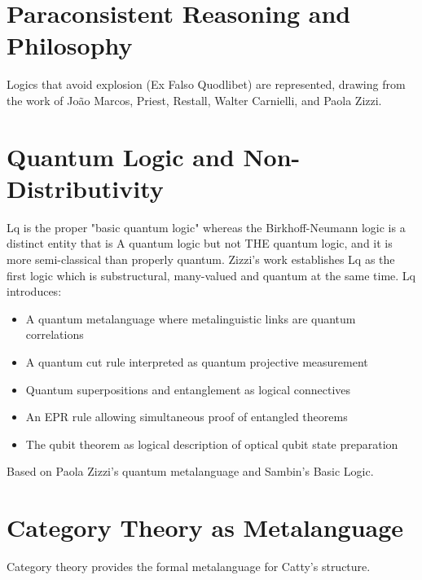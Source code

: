 \section*{Paraconsistent Reasoning and Philosophy}
Logics that avoid explosion (Ex Falso Quodlibet) are represented, drawing from the work of João Marcos, Priest, Restall, Walter Carnielli, and Paola Zizzi.

\section*{Quantum Logic and Non-Distributivity}
Lq is the proper "basic quantum logic" whereas the Birkhoff-Neumann logic is a distinct entity that is A quantum logic but not THE quantum logic, and it is more semi-classical than properly quantum. Zizzi's work establishes Lq as the first logic which is substructural, many-valued and quantum at the same time. Lq introduces:

\begin{itemize}
    \item A quantum metalanguage where metalinguistic links are quantum correlations
    \item A quantum cut rule interpreted as quantum projective measurement
    \item Quantum superpositions and entanglement as logical connectives
    \item An EPR rule allowing simultaneous proof of entangled theorems
    \item The qubit theorem as logical description of optical qubit state preparation
\end{itemize}

Based on Paola Zizzi's quantum metalanguage \cite{zizzi2010quantum} and Sambin's Basic Logic.

\section*{Category Theory as Metalanguage}
Category theory \cite{maclane1971categories, pierce1991category, lawvere1963functorial} provides the formal metalanguage for Catty's structure.

